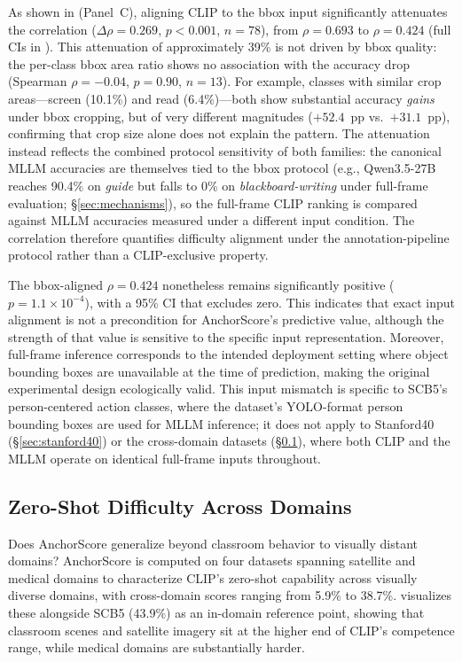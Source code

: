 \documentclass[11pt,a4paper]{article}
\begin{document}
As shown in  (Panel~C), aligning CLIP to the bbox input significantly attenuates the correlation ($\Delta\rho=0.269$, $p<0.001$, $n=78$), from $\rho=0.693$ to $\rho=0.424$ (full CIs in ). This attenuation of approximately 39\% is not driven by bbox quality: the per-class bbox area ratio shows no association with the accuracy drop (Spearman $\rho=-0.04$, $p=0.90$, $n=13$). For example, classes with similar crop areas---screen (10.1\%) and read (6.4\%)---both show substantial accuracy \emph{gains} under bbox cropping, but of very different magnitudes ($+52.4$~pp vs.\ $+31.1$~pp), confirming that crop size alone does not explain the pattern. The attenuation instead reflects the combined protocol sensitivity of both families: the canonical MLLM accuracies are themselves tied to the bbox protocol (e.g., Qwen3.5-27B reaches 90.4\% on \textit{guide} but falls to 0\% on \textit{blackboard-writing} under full-frame evaluation; \S\ref{sec:mechanisms}), so the full-frame CLIP ranking is compared against MLLM accuracies measured under a different input condition. The correlation therefore quantifies difficulty alignment under the annotation-pipeline protocol rather than a CLIP-exclusive property.

The bbox-aligned $\rho=0.424$ nonetheless remains significantly positive ($p=1.1\times10^{-4}$), with a 95\% CI that excludes zero. This indicates that exact input alignment is not a precondition for AnchorScore's predictive value, although the strength of that value is sensitive to the specific input representation. Moreover, full-frame inference corresponds to the intended deployment setting where object bounding boxes are unavailable at the time of prediction, making the original experimental design ecologically valid. This input mismatch is specific to SCB5's person-centered action classes, where the dataset's YOLO-format person bounding boxes are used for MLLM inference; it does not apply to Stanford40 (\S\ref{sec:stanford40}) or the cross-domain datasets (\S\ref{sec:cross_domain}), where both CLIP and the MLLM operate on identical full-frame inputs throughout.

\subsection{Zero-Shot Difficulty Across Domains}
\label{sec:cross_domain}

Does AnchorScore generalize beyond classroom behavior to visually distant domains? AnchorScore is computed on four datasets spanning satellite and medical domains to characterize CLIP's zero-shot capability across visually diverse domains, with cross-domain scores ranging from 5.9\% to 38.7\%.  visualizes these alongside SCB5 (43.9\%) as an in-domain reference point, showing that classroom scenes and satellite imagery sit at the higher end of CLIP's competence range, while medical domains are substantially harder.
\end{document}

